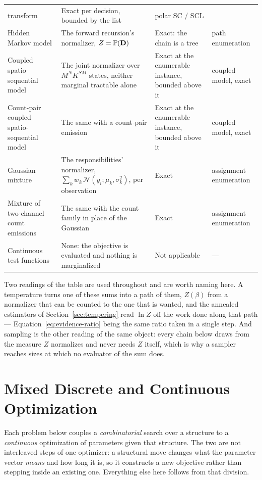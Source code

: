 \documentclass[11pt,a4paper]{article}
\begin{document}
\begin{longtable}{@{}p{}p{}p{}p{}@{}}
    transform
  & Exact per decision, bounded by the list
  & polar SC / SCL \\
  Hidden Markov model
  & The forward recursion's normalizer, $Z = \mathbb{P}(\mathbf{D})$
  & Exact: the chain is a tree
  & path enumeration \\
  Coupled spatio-sequential model
  & The joint normalizer over $M^{N} K^{SM}$ states, neither marginal tractable
    alone
  & Exact at the enumerable instance, bounded above it
  & coupled model, exact \\
  Count-pair coupled spatio-sequential model
  & The same with a count-pair emission
  & Exact at the enumerable instance, bounded above it
  & coupled model, exact \\
  Gaussian mixture
  & The responsibilities' normalizer, $\sum_k w_k\,
    \mathcal{N}(y_i; \mu_k, \sigma_k^2)$, per observation
  & Exact
  & assignment enumeration \\
  Mixture of two-channel count emissions
  & The same with the count family in place of the Gaussian
  & Exact
  & assignment enumeration \\
  Continuous test functions
  & None: the objective is evaluated and nothing is marginalized
  & Not applicable
  & --- \\
\end{longtable}

Two readings of the table are used throughout and are worth naming here. A
temperature turns one of these sums into a path of them, $Z(\beta)$ from a
normalizer that can be counted to the one that is wanted, and the annealed
estimators of Section~\ref{sec:tempering} read $\ln Z$ off the work done along
that path \citep{neal2001} --- Equation~\ref{eq:evidence-ratio} being the same
ratio taken in a single step. And sampling is the other reading of the same
object: every chain below draws from the measure $Z$ normalizes and never needs
$Z$ itself, which is why a sampler reaches sizes at which no evaluator of the
sum does.

\section{Mixed Discrete and Continuous Optimization}
\label{sec:shape}

Each problem below couples a \emph{combinatorial} search over a structure to a
\emph{continuous} optimization of parameters given that structure. The two are
not interleaved steps of one optimizer: a structural move changes what the
parameter vector \emph{means} and how long it is, so it constructs a new
objective rather than stepping inside an existing one. Everything else here
follows from that division.
\end{document}
